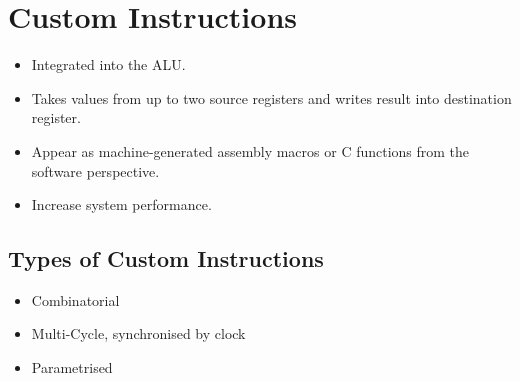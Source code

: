 \section{Custom Instructions}

	\begin{itemize}
	  \item Integrated into the ALU.
	  \item Takes values from up to two source registers and writes result into destination register.
	  \item Appear as machine-generated assembly macros or C functions from the software perspective.
	  \item Increase system performance.
	\end{itemize}
		
	\subsection{Types of Custom Instructions}
	
	\begin{itemize}
	  \item Combinatorial
	  \item Multi-Cycle, synchronised by clock
	  \item Parametrised
	\end{itemize}
	